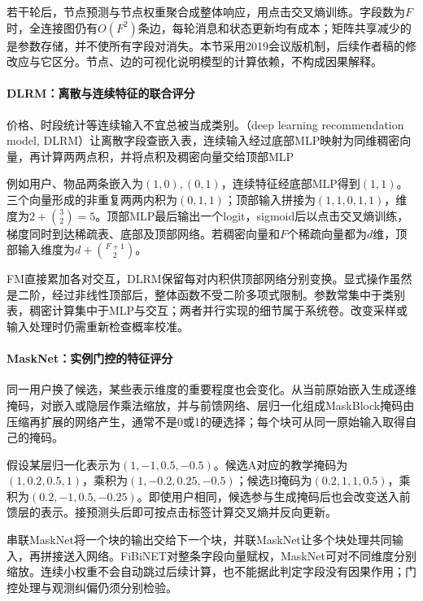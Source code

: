若干轮后，节点预测与节点权重聚合成整体响应，用点击交叉熵训练。字段数为$F$时，全连接图仍有$O(F^2)$条边，每轮消息和状态更新均有成本；矩阵共享减少的是参数存储，并不使所有字段对消失。本节采用2019会议版机制，后续作者稿的修改应与它区分。节点、边的可视化说明模型的计算依赖，不构成因果解释。

\paragraph{DLRM：离散与连续特征的联合评分}
\label{sec:rs-dlrm}

价格、时段统计等连续输入不宜总被当成类别。（deep learning recommendation model, DLRM）让离散字段查嵌入表，连续输入经过底部MLP映射为同维稠密向量，再计算两两点积，并将点积及稠密向量交给顶部MLP

例如用户、物品两条嵌入为$(1,0),(0,1)$，连续特征经底部MLP得到$(1,1)$。三个向量形成的非重复两两内积为$(0,1,1)$；顶部输入拼接为$(1,1,0,1,1)$，维度为$2+\binom32=5$。顶部MLP最后输出一个logit，sigmoid后以点击交叉熵训练，梯度同时到达稀疏表、底部及顶部网络。若稠密向量和$F$个稀疏向量都为$d$维，顶部输入维度为$d+\binom{F+1}{2}$。

FM直接累加各对交互，DLRM保留每对内积供顶部网络分别变换。显式操作虽然是二阶，经过非线性顶部后，整体函数不受二阶多项式限制。参数常集中于类别表，稠密计算集中于MLP与交互；两者并行实现的细节属于系统卷。改变采样或输入处理时仍需重新检查概率校准。

\paragraph{MaskNet：实例门控的特征评分}
\label{sec:rs-masknet}

同一用户换了候选，某些表示维度的重要程度也会变化。从当前原始嵌入生成逐维掩码，对嵌入或隐层作乘法缩放，并与前馈网络、层归一化组成MaskBlock掩码由压缩再扩展的网络产生，通常不是0或1的硬选择；每个块可从同一原始输入取得自己的掩码。

假设某层归一化表示为$(1,-1,0.5,-0.5)$。候选A对应的教学掩码为$(1,0.2,0.5,1)$，乘积为$(1,-0.2,0.25,-0.5)$；候选B掩码为$(0.2,1,1,0.5)$，乘积为$(0.2,-1,0.5,-0.25)$。即使用户相同，候选参与生成掩码后也会改变送入前馈层的表示。接预测头后即可按点击标签计算交叉熵并反向更新。

串联MaskNet将一个块的输出交给下一个块，并联MaskNet让多个块处理共同输入，再拼接送入网络。FiBiNET对整条字段向量赋权，MaskNet可对不同维度分别缩放。连续小权重不会自动跳过后续计算，也不能据此判定字段没有因果作用；门控处理与观测纠偏仍须分别检验。

